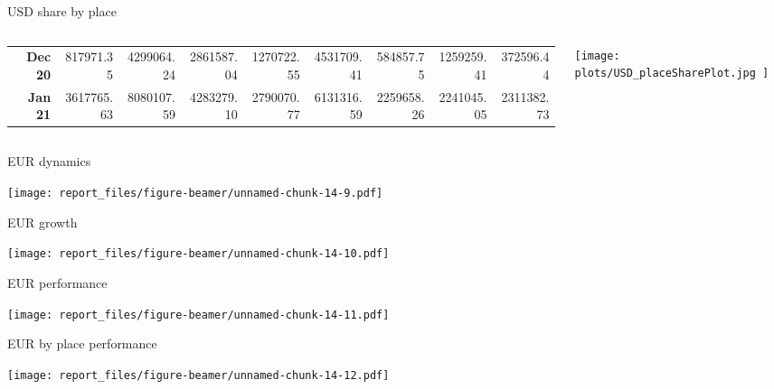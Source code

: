 \documentclass[ignorenonframetext,]{beamer}
\begin{document}
\begin{frame}{USD share by place}
\begin{columns}
\begin{column}{0.6\textwidth}
\begin{table}[ht]
{\begin{tabular}{rrrrrrrrr}
  {\textbf{Dec 20}} & 817971.35 & 4299064.24 & 2861587.04 & 1270722.55 & 4531709.41 & 584857.75 & 1259259.41 & 372596.44 \\ 
  {\textbf{Jan 21}} & 3617765.63 & 8080107.59 & 4283279.10 & 2790070.77 & 6131316.59 & 2259658.26 & 2241045.05 & 2311382.73 \\ 
   \hline
\end{tabular}
}
\end{table}
\end{column}\begin{column}{0.4\textwidth}\vspace*{-6cm}\hspace*{-0.5cm}\texttt{[image:  plots/USD\_placeSharePlot.jpg ]}\end{column}\end{columns}

\end{frame}

\begin{frame}{EUR dynamics}
\protect\hypertarget{eur-dynamics}{}

\texttt{[image: report\_files/figure-beamer/unnamed-chunk-14-9.pdf]}

\end{frame}

\begin{frame}{EUR growth}
\protect\hypertarget{eur-growth}{}

\texttt{[image: report\_files/figure-beamer/unnamed-chunk-14-10.pdf]}

\end{frame}

\begin{frame}{EUR performance}
\protect\hypertarget{eur-performance}{}

\texttt{[image: report\_files/figure-beamer/unnamed-chunk-14-11.pdf]}

\end{frame}

\begin{frame}{EUR by place performance}
\protect\hypertarget{eur-by-place-performance}{}

\texttt{[image: report\_files/figure-beamer/unnamed-chunk-14-12.pdf]}

\end{frame}
\end{document}
